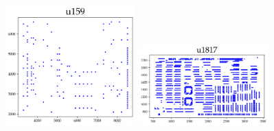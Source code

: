 \begin{appendices}
\begin{figure}[H]
\includegraphics[width=5cm]{../tsplib_euc2d_pictures_of_instances/u159.png}
\includegraphics[width=5cm]{../tsplib_euc2d_pictures_of_instances/u1817.png}

\end{figure}


\end{appendices}
